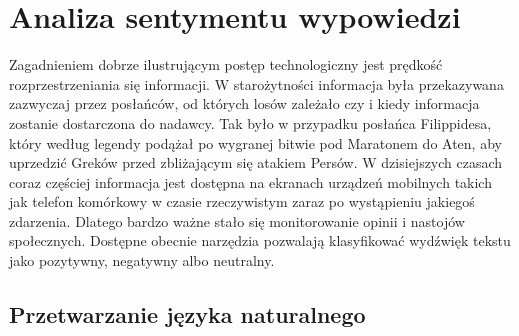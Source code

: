 \chapter{Analiza sentymentu wypowiedzi}
Zagadnieniem dobrze ilustrującym postęp technologiczny jest prędkość rozprzestrzeniania się informacji. W starożytności informacja była przekazywana zazwyczaj przez posłańców, od których losów zależało czy i kiedy informacja zostanie dostarczona do nadawcy. Tak było w przypadku posłańca Filippidesa, który według legendy podążał po wygranej bitwie pod Maratonem do Aten, aby uprzedzić Greków przed zbliżającym się atakiem Persów. W dzisiejszych czasach coraz częściej informacja jest dostępna na ekranach urządzeń mobilnych takich jak telefon komórkowy w czasie rzeczywistym zaraz po wystąpieniu jakiegoś zdarzenia. Dlatego bardzo ważne stało się monitorowanie opinii i nastojów społecznych. Dostępne obecnie narzędzia pozwalają klasyfikować wydźwięk tekstu jako pozytywny, negatywny albo neutralny.

\section{Przetwarzanie języka naturalnego}

